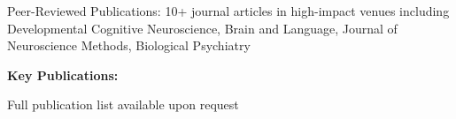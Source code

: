 

{\scriptsize Peer-Reviewed Publications: 10+ journal articles in high-impact venues including Developmental Cognitive Neuroscience, Brain and Language, Journal of Neuroscience Methods, Biological Psychiatry}

\textbf{Key Publications:}

\begin{refsection}
	\nocite{joo2021}
	\nocite{bosseler2021}
	\nocite{clarke2020}
	\nocite{appelhoff2019}
  \nocite{roberts2011}
  \nocite{tavabi2011}
  \nocite{tavabi2011a}
	\printbibliography[
	heading=none
	]
\end{refsection}

{\scriptsize Full publication list available upon request}


